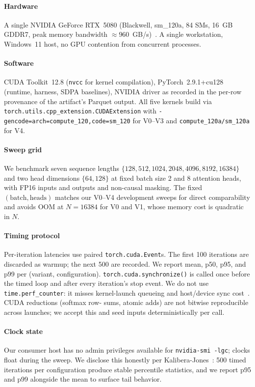 \documentclass[conference]{IEEEtran}
\begin{document}
\paragraph*{Hardware} A single NVIDIA GeForce RTX~5080 (Blackwell,
sm\_120a, 84 SMs, 16~GB GDDR7, peak memory bandwidth $\approx
960$~GB/s)~\cite{nvidia2025blackwell}. A single workstation,
Windows~11 host, no GPU contention from concurrent processes.

\paragraph*{Software} CUDA Toolkit~12.8 (\texttt{nvcc} for kernel
compilation), PyTorch~2.9.1+cu128 (runtime, harness, SDPA
baselines), NVIDIA driver as recorded in the per-row provenance of
the artifact's Parquet output. All five kernels build via
\texttt{torch.utils.cpp\_extension.CUDAExtension} with
\texttt{-gencode=arch=compute\_120,code=sm\_120} for V0--V3 and
\texttt{compute\_120a/sm\_120a} for V4.

\paragraph*{Sweep grid} We benchmark seven sequence lengths
$\{128,512,1024,2048,4096,8192,16384\}$ and two head dimensions
$\{64,128\}$ at fixed batch size 2 and 8 attention heads, with FP16
inputs and outputs and non-causal masking. The fixed
$(\mathrm{batch}, \mathrm{heads})$ matches our V0--V4 development
sweeps for direct comparability and avoids OOM at $N = 16384$ for
V0 and V1, whose memory cost is quadratic in $N$.

\paragraph*{Timing protocol} Per-iteration latencies use paired
\texttt{torch.cuda.Event}s. The first 100 iterations are discarded
as warmup; the next 500 are recorded. We report mean, p50, p95, and
p99 per (variant, configuration). \texttt{torch.cuda.synchronize()}
is called once before the timed loop and after every iteration's
stop event. We do not use \texttt{time.perf\_counter}: it misses
kernel-launch queueing and host/device sync
cost~\cite{kalibera2013rigorous}. CUDA reductions (softmax row-
sums, atomic adds) are not bitwise reproducible across launches; we
accept this and seed inputs deterministically per call.

\paragraph*{Clock state} Our consumer host has no admin privileges
available for \texttt{nvidia-smi -lgc}; clocks float during the
sweep. We disclose this honestly per
Kalibera-Jones~\cite{kalibera2013rigorous}: 500 timed iterations
per configuration produce stable percentile statistics, and we
report p95 and p99 alongside the mean to surface tail behavior.
\end{document}
